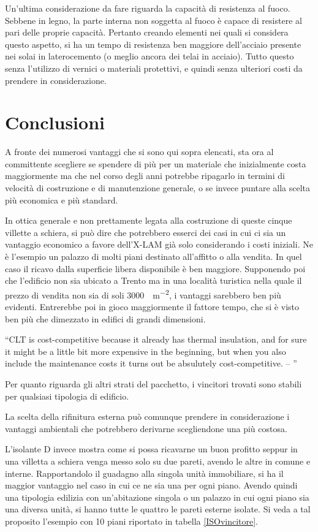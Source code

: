 Un'ultima considerazione da fare riguarda la capacità di resistenza al fuoco. 
Sebbene in legno, la parte interna non soggetta al fuoco è capace di resistere al pari delle proprie capacità. 
Pertanto creando elementi nei quali si considera questo aspetto, si ha un tempo di resistenza ben maggiore dell'acciaio presente nei solai in laterocemento (o meglio ancora dei telai in acciaio). 
Tutto questo senza l'utilizzo di vernici o materiali protettivi, e quindi senza ulteriori costi da prendere in considerazione.
%
\section{Conclusioni}
A fronte dei numerosi vantaggi che si sono qui sopra elencati, sta ora al committente scegliere se spendere di più per un materiale che inizialmente costa maggiormente ma che nel corso degli anni potrebbe ripagarlo in termini di velocità di costruzione e di manutenzione generale, o se invece puntare alla scelta più economica e più standard.

In ottica generale e non prettamente legata alla costruzione di queste cinque villette a schiera, si può dire che potrebbero esserci dei casi in cui ci sia un vantaggio economico a favore dell'X-LAM già solo considerando i costi iniziali. 
Ne è l'esempio un palazzo di molti piani destinato all'affitto o alla vendita.
In quel caso il ricavo dalla superficie libera disponibile è ben maggiore.
Supponendo poi che l'edificio non sia ubicato a Trento ma in una località turistica nella quale il prezzo di vendita non sia di soli \SI{3000}{\teuro \per \square\metre}, i vantaggi sarebbero ben più evidenti.
Entrerebbe poi in gioco maggiormente il fattore tempo, che si è visto ben più che dimezzato in edifici di grandi dimensioni.


\vspace{1cm}
\noindent \enquote{CLT is cost-competitive because it already has thermal insulation, \omissis{} and for sure it might be a little bit more expensive in the beginning, but when you also include the maintenance costs it turns out be absulutely cost-competitive. -- \textcite{mallo_outlook_2014}}

\vspace{1cm}
Per quanto riguarda gli altri strati del pacchetto, i vincitori trovati sono stabili per qualsiasi tipologia di edificio.

La scelta della rifinitura esterna può comunque prendere in considerazione i vantaggi ambientali che potrebbero derivarne scegliendone una più costosa.

L'isolante D invece mostra come si possa ricavarne un buon profitto seppur in una villetta a schiera venga messo solo su due pareti, avendo le altre in comune e interne. 
Rapportandolo il guadagno alla singola unità immobiliare, si ha il maggior vantaggio nel caso in cui ce ne sia una per ogni piano. 
Avendo quindi una tipologia edilizia con un'abitazione singola o un palazzo in cui ogni piano sia una diversa unità, si hanno tutte le quattro le pareti esterne isolate. 
Si veda a tal proposito l'esempio con 10 piani riportato in tabella \ref{ISOvincitore}.